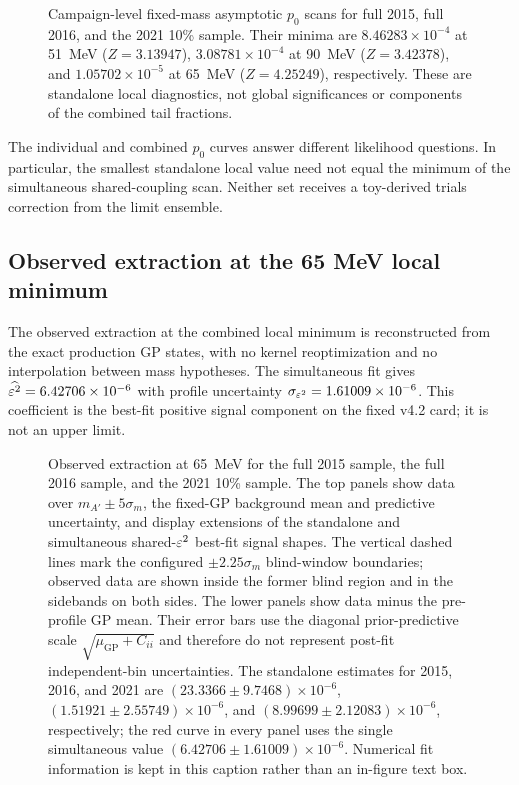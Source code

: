 \begin{figure}[H]
\centering
{}
\caption{Campaign-level fixed-mass asymptotic $p_0$ scans for full 2015, full
2016, and the 2021 10\% sample. Their minima are
$8.46283\times10^{-4}$ at 51~MeV ($Z=3.13947$),
$3.08781\times10^{-4}$ at 90~MeV ($Z=3.42378$), and
$1.05702\times10^{-5}$ at 65~MeV ($Z=4.25249$), respectively. These are
standalone local diagnostics, not global significances or components of the
combined tail fractions.}
\label{fig:results-v4p2-individual-p0}
\end{figure}

The individual and combined $p_0$ curves answer different likelihood questions.
In particular, the smallest standalone local value need not equal the minimum of
the simultaneous shared-coupling scan. Neither set receives a toy-derived trials
correction from the limit ensemble.

\subsection{Observed extraction at the 65 MeV local minimum}
\label{sec:results-v4p2-m065-extraction}

The observed extraction at the combined local minimum is reconstructed from the
exact production GP states, with no kernel reoptimization and no interpolation
between mass hypotheses. The simultaneous fit gives
$\widehat{\varepsilon^2}=6.42706\times10^{-6}$ with profile uncertainty
$\sigma_{\varepsilon^2}=1.61009\times10^{-6}$. This coefficient is the best-fit
positive signal component on the fixed v4.2 card; it is not an upper limit.

\begin{figure}[H]
\centering
{}
\caption{Observed extraction at 65~MeV for the full 2015 sample, the full 2016
sample, and the 2021 10\% sample. The top panels show data over
$m_{A'}\pm5\sigma_m$, the fixed-GP background mean and predictive uncertainty,
and display extensions of the standalone and simultaneous shared-$\varepsilon^2$
best-fit signal shapes. The vertical dashed lines mark the configured
$\pm2.25\sigma_m$ blind-window boundaries; observed data are shown inside the
former blind region and in the sidebands on both sides. The lower panels show
data minus the pre-profile GP mean. Their error bars use the diagonal
prior-predictive scale $\sqrt{\mu_{\mathrm{GP}}+C_{ii}}$ and therefore do not
represent post-fit independent-bin uncertainties. The standalone estimates for
2015, 2016, and 2021 are
$(23.3366\pm9.7468)\times10^{-6}$,
$(1.51921\pm2.55749)\times10^{-6}$, and
$(8.99699\pm2.12083)\times10^{-6}$, respectively; the red curve in every panel
uses the single simultaneous value
$(6.42706\pm1.61009)\times10^{-6}$. Numerical fit information is kept in this
caption rather than an in-figure text box.}
\label{fig:results-v4p2-m065-extraction}
\end{figure}

